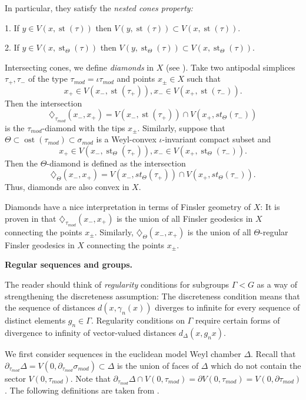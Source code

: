 \documentclass[12pt]{article}
\theoremstyle{boldplain}
\theoremstyle{bolddefinition}
\numberwithin{equation}{section}
\def\ga{\gamma}
\def\Ga{\Gamma}
\def\De{\Delta}
\def\si{\sigma}
\def\D{\partial}
\def\diamot{\diamondsuit_{\tau_{mod}}}
\def\diamoTh{\diamondsuit_{\Theta}}
\def\Dt{\partial_{\tau_{mod}}}
\def\simod{\si_{mod}}
\def\st{\operatorname{st}}
\def\ost{\operatorname{ost}}
\def\taumod{\tau_{mod}}
\begin{document}
 {In particular, they satisfy the {\em nested cones property:}}
 
{1. If $y\in  V(x, \st(\tau))$ then $V(y, \st(\tau))\subset V(x, \st(\tau))$.} 
 
 {2. If $y\in  V(x, \st_\Theta(\tau))$ then $V(y, \st_\Theta(\tau))\subset V(x, \st_\Theta(\tau))$.}

 
 
Intersecting cones, we define {\em diamonds} in $X$ (see \cite[\S 2.5]{anolec}). 
Take two antipodal simplices $\tau_+, \tau_-$ of the type 
$\taumod= \iota\taumod$ and points $x_\pm \in X$ such that 
$$
x_+\in V(x_-, \st(\tau_+)), x_-\in V(x_+, \st(\tau_-)). 
$$ 
 Then the intersection 
 $$
 \diamot(x_-, x_+)= V(x_-, \st(\tau_+)) \cap V(x_+, st_\Theta(\tau_-))
 $$
 is the $\taumod$-diamond with the tips $x_\pm$. Similarly, suppose that 
 $\Theta\subset \ost(\taumod)\subset \simod$ is a Weyl-convex $\iota$-invariant compact subset and 
 $$
x_+\in V(x_-, \st_\Theta(\tau_+)), x_-\in V(x_+, \st_\Theta(\tau_-)). 
$$ 
 Then  the $\Theta$-diamond is defined as the intersection 
  $$
 \diamoTh(x_-, x_+)= V(x_-, st_\Theta(\tau_+)) \cap V(x_+, st_\Theta(\tau_-)). 
 $$
 Thus, diamonds are also convex in $X$. 
 
 Diamonds have a nice interpretation in terms of Finsler geometry of $X$: It is proven in \cite{bordif} that  $\diamot(x_-, x_+)$ is the union of all Finsler geodesics in $X$ connecting 
 the points $x_\pm$. Similarly, $\diamoTh(x_-, x_+)$ 
 is the union of all $\Theta$-regular Finsler geodesics in $X$ connecting  the points $x_\pm$. 

\medskip 
 {\bf Regular sequences and groups.} 
 
The reader should think of {\em regularity} conditions for subgroups $\Ga< G$ as a way of strengthening the discreteness assumption: The discreteness condition means that 
the sequence of distances $d(x, \ga_n(x))$ diverges to infinite for every sequence of distinct elements $g_n\in \Ga$. Regularity conditions on $\Ga$ require certain  forms of divergence to infinity of vector-valued distances $d_\De(x, g_n x)$.  
 
We first consider sequences in the euclidean model Weyl chamber $\De$.
Recall that $\Dt\De=V(0,\Dt\simod)\subset\De$ 
is the union of faces of $\De$ which do not contain the sector $V(0,\taumod)$.
Note that $\Dt\De\cap V(0,\taumod)=\D V(0,\taumod)=V(0,\D\taumod)$. 
The following definitions are  taken from \cite[\S 4.2]{anolec}.  
\end{document}
